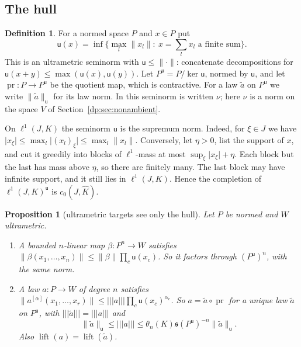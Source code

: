 \documentclass[11pt]{amsart}
\newtheorem{proposition}[theorem]{Proposition}
\theoremstyle{definition}
\newtheorem{definition}[theorem]{Definition}
\theoremstyle{remark}
\numberwithin{equation}{section}
\newcommand{\abs}[1]{\lvert #1\rvert}
\newcommand{\norm}[1]{\lVert #1\rVert}
\newcommand{\Kh}{\widehat K}
\theoremstyle{plain}
\theoremstyle{definition}
\theoremstyle{plain}
\begin{document}
\subsection{The hull}\label{dp:s:ssec-hull}

\begin{definition}\label{dp:def:hull}
For a normed space $P$ and $x\in P$ put
\[
 \mathsf u(x)=\inf\bigl\{\max_l\norm{x_l}:\ x=\sum_lx_l\text{ a finite sum}\bigr\}.
\]
This is an ultrametric seminorm with $\mathsf u\le\norm\cdot$: concatenate decompositions for $\mathsf u(x+y)\le\max(\mathsf u(x),\mathsf u(y))$. Let $P^{\mathsf u}=P/\ker\mathsf u$, normed by $\mathsf u$, and let $\operatorname{pr}\colon P\to P^{\mathsf u}$ be the quotient map, which is contractive. For a law $\tilde a$ on $P^{\mathsf u}$ we write $\norm{\tilde a}_{\mathsf u}$ for its law norm. In \cite[proof of Theorem~14.39(4)]{I} this seminorm is written $\nu$; here $\nu$ is a norm on the space $V$ of Section~\ref{dp:sec:nonambient}.
\end{definition}

On $\ell^1(J,K)$ the seminorm $\mathsf u$ is the supremum norm. Indeed, for $\xi\in J$ we have $\abs{x_\xi}\le\max_l\abs{(x_l)_\xi}\le\max_l\norm{x_l}$. Conversely, let $\eta>0$, list the support of $x$, and cut it greedily into blocks of $\ell^1$-mass at most $\sup_\xi\abs{x_\xi}+\eta$. Each block but the last has mass above $\eta$, so there are finitely many. The last block may have infinite support, and it still lies in $\ell^1(J,K)$. Hence the completion of $\ell^1(J,K)^{\mathsf u}$ is $c_0(J,\Kh)$.

\begin{proposition}[ultrametric targets see only the hull]\label{dp:prop:hull}
Let $P$ be normed and $W$ ultrametric.
\begin{enumerate}
\item A bounded $n$\nobreakdash-linear map $\beta\colon P^n\to W$ satisfies $\norm{\beta(x_1,\dots,x_n)}\le\norm\beta\prod_c\mathsf u(x_c)$. So it factors through $(P^{\mathsf u})^n$, with the same norm.
\item A law $a\colon P\to W$ of degree $n$ satisfies $\norm{a^{[\alpha]}(x_1,\dots,x_r)}\le\lvert\!\lvert\!\lvert a\rvert\!\rvert\!\rvert\prod_c\mathsf u(x_c)^{\alpha_c}$. So $a=\tilde a\circ\operatorname{pr}$ for a unique law $\tilde a$ on $P^{\mathsf u}$, with $\lvert\!\lvert\!\lvert \tilde a\rvert\!\rvert\!\rvert=\lvert\!\lvert\!\lvert a\rvert\!\rvert\!\rvert$ and
\[
 \norm{\tilde a}_{\mathsf u}\le\lvert\!\lvert\!\lvert a\rvert\!\rvert\!\rvert\le\theta_n(K)\mathfrak s(P^{\mathsf u})^{-n}\norm{\tilde a}_{\mathsf u}.
\]
Also $\operatorname{lift}(a)=\operatorname{lift}(\tilde a)$.
\end{enumerate}
\end{proposition}
\end{document}
